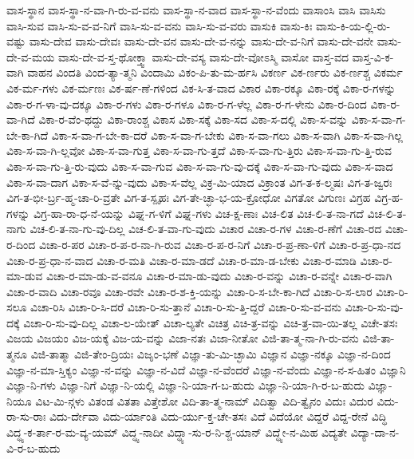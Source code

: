 {ವಾಸ-ಸ್ಥಾನ
ವಾಸ-ಸ್ಥಾ-ನ-ವಾ-ಗಿ-ರು-ವ-ವನು
ವಾಸ-ಸ್ಥಾ-ನ-ವಾದ
ವಾಸ-ಸ್ಥಾ-ನ-ವೆಂದು
ವಾಸಾಂಸಿ
ವಾಸಿ
ವಾಸಿಸು
ವಾಸಿ-ಸುವ
ವಾಸಿ-ಸು-ವ-ವ-ನಿಗೆ
ವಾಸಿ-ಸು-ವ-ವನು
ವಾಸಿ-ಸು-ವ-ವರು
ವಾಸುಕಿ
ವಾಸು-ಕಿಃ
ವಾಸು-ಕಿ-ಯ-ಲ್ಲಿ-ರು-ವಷ್ಟು
ವಾಸು-ದೇವ
ವಾಸು-ದೇವಃ
ವಾಸು-ದೇ-ವನ
ವಾಸು-ದೇ-ವ-ನನ್ನು
ವಾಸು-ದೇ-ವ-ನಿಗೆ
ವಾಸು-ದೇ-ವನೇ
ವಾಸು-ದೇ-ವ-ಮಯ
ವಾಸು-ದೇ-ವ-ಸ್ತ-ಥೋಕ್ತ್ವಾ
ವಾಸು-ದೇ-ವಸ್ಯ
ವಾಸು-ದೇ-ವೋಽಸ್ಮಿ
ವಾಸೋ
ವಾಸ್ತ-ವದ
ವಾಸ್ತ-ವಿ-ಕ-ವಾಗಿ
ವಾಹನ
ವಿಂದತಿ
ವಿಂದ-ತ್ಯಾ-ತ್ಮನಿ
ವಿಂದಾಮಿ
ವಿಕಂ-ಪಿ-ತು-ಮ-ರ್ಹಸಿ
ವಿಕರ್ಣ
ವಿಕ-ರ್ಣರು
ವಿಕ-ರ್ಣಶ್ಚ
ವಿಕರ್ಮ
ವಿಕ-ರ್ಮ-ಗಳು
ವಿಕ-ರ್ಮಣಃ
ವಿಕ-ರ್ಷ-ಣೆ-ಗಳಿಂದ
ವಿಕ-ಸಿ-ತ-ವಾದ
ವಿಕಾರ
ವಿಕಾ-ರಕ್ಕೂ
ವಿಕಾ-ರಕ್ಕೆ
ವಿಕಾ-ರ-ಗಳನ್ನು
ವಿಕಾ-ರ-ಗ-ಳಾ-ವು-ದಕ್ಕೂ
ವಿಕಾ-ರ-ಗಳು
ವಿಕಾ-ರ-ಗಳೂ
ವಿಕಾ-ರ-ಗ-ಳೆಲ್ಲ
ವಿಕಾ-ರ-ಗ-ಳೇನು
ವಿಕಾ-ರ-ದಿಂದ
ವಿಕಾ-ರ-ವಾ-ಗಿದೆ
ವಿಕಾ-ರ-ವೆಂ-ಥದ್ದು
ವಿಕಾ-ರಾಂಶ್ಚ
ವಿಕಾಸ
ವಿಕಾ-ಸಕ್ಕೆ
ವಿಕಾ-ಸದ
ವಿಕಾ-ಸ-ದಲ್ಲಿ
ವಿಕಾ-ಸ-ವನ್ನು
ವಿಕಾ-ಸ-ವಾ-ಗ-ಬೇ-ಕಾ-ಗಿದೆ
ವಿಕಾ-ಸ-ವಾ-ಗ-ಬೇ-ಕಾ-ದರೆ
ವಿಕಾ-ಸ-ವಾ-ಗ-ಬೇಕು
ವಿಕಾ-ಸ-ವಾ-ಗಲು
ವಿಕಾ-ಸ-ವಾಗಿ
ವಿಕಾ-ಸ-ವಾ-ಗಿಲ್ಲ
ವಿಕಾ-ಸ-ವಾ-ಗಿ-ಲ್ಲವೋ
ವಿಕಾ-ಸ-ವಾ-ಗುತ್ತ
ವಿಕಾ-ಸ-ವಾ-ಗು-ತ್ತದೆ
ವಿಕಾ-ಸ-ವಾ-ಗು-ತ್ತಿರು
ವಿಕಾ-ಸ-ವಾ-ಗು-ತ್ತಿ-ರುವ
ವಿಕಾ-ಸ-ವಾ-ಗು-ತ್ತಿ-ರು-ವುದು
ವಿಕಾ-ಸ-ವಾ-ಗುವ
ವಿಕಾ-ಸ-ವಾ-ಗು-ವು-ದಕ್ಕೆ
ವಿಕಾ-ಸ-ವಾ-ಗು-ವುದು
ವಿಕಾ-ಸ-ವಾದ
ವಿಕಾ-ಸ-ವಾ-ದಾಗ
ವಿಕಾ-ಸ-ವೆ-ನ್ನು-ವುದು
ವಿಕಾ-ಸ-ವೆಲ್ಲ
ವಿಕ್ರ-ಮಿ-ಯಾದ
ವಿಕ್ರಾಂತ
ವಿಗ-ತ-ಕ-ಲ್ಮಷಃ
ವಿಗ-ತ-ಜ್ವರಃ
ವಿಗ-ತ-ಭೀ-ರ್ಬ್ರ-ಹ್ಮ-ಚಾ-ರಿ-ವ್ರತೇ
ವಿಗ-ತ-ಸ್ಪೃಹಃ
ವಿಗ-ತೇ-ಚ್ಛಾ-ಭ-ಯ-ಕ್ರೋಧೋ
ವಿಗತೋ
ವಿಗುಣಃ
ವಿಗ್ರಹ
ವಿಗ್ರ-ಹ-ಗಳನ್ನು
ವಿಗ್ರ-ಹಾ-ರಾ-ಧ-ನೆ-ಯನ್ನು
ವಿಘ್ನ-ಗ-ಳಿಗೆ
ವಿಘ್ನ-ಗಳು
ವಿಚ-ಕ್ಷ-ಣಾಃ
ವಿಚ-ಲಿತ
ವಿಚ-ಲಿ-ತ-ನಾ-ಗದೆ
ವಿಚ-ಲಿ-ತ-ನಾಗು
ವಿಚ-ಲಿ-ತ-ನಾ-ಗು-ವು-ದಿಲ್ಲ
ವಿಚ-ಲಿ-ತ-ವಾ-ಗು-ವುದು
ವಿಚಾರ
ವಿಚಾ-ರ-ಗಳ
ವಿಚಾ-ರ-ಣೆಗೆ
ವಿಚಾ-ರದ
ವಿಚಾ-ರ-ದಿಂದ
ವಿಚಾ-ರ-ಪರ
ವಿಚಾ-ರ-ಪ-ರ-ನಾ-ಗಿ-ರುವ
ವಿಚಾ-ರ-ಪ-ರ-ನಿಗೆ
ವಿಚಾ-ರ-ಪ್ರ-ಣಾ-ಳಿಗೆ
ವಿಚಾ-ರ-ಪ್ರ-ಧಾ-ನದ
ವಿಚಾ-ರ-ಪ್ರ-ಧಾ-ನ-ವಾದ
ವಿಚಾ-ರ-ಮತಿ
ವಿಚಾ-ರ-ಮಾ-ಡದೆ
ವಿಚಾ-ರ-ಮಾ-ಡ-ಬೇಕು
ವಿಚಾ-ರ-ಮಾಡಿ
ವಿಚಾ-ರ-ಮಾ-ಡುವ
ವಿಚಾ-ರ-ಮಾ-ಡು-ವ-ವನೂ
ವಿಚಾ-ರ-ಮಾ-ಡು-ವುದು
ವಿಚಾ-ರ-ವನ್ನು
ವಿಚಾ-ರ-ವನ್ನೇ
ವಿಚಾ-ರ-ವಾಗಿ
ವಿಚಾ-ರ-ವಾದಿ
ವಿಚಾ-ರವೂ
ವಿಚಾ-ರವೇ
ವಿಚಾ-ರ-ಶ-ಕ್ತಿ-ಯನ್ನು
ವಿಚಾ-ರಿ-ಸ-ಬೇ-ಕಾ-ಗಿದೆ
ವಿಚಾ-ರಿ-ಸ-ಲಾರ
ವಿಚಾ-ರಿ-ಸಲೂ
ವಿಚಾ-ರಿಸಿ
ವಿಚಾ-ರಿ-ಸಿ-ದರೆ
ವಿಚಾ-ರಿ-ಸು-ತ್ತಾನೆ
ವಿಚಾ-ರಿ-ಸು-ತ್ತಿ-ದ್ದರೆ
ವಿಚಾ-ರಿ-ಸು-ವ-ವನು
ವಿಚಾ-ರಿ-ಸು-ವು-ದಕ್ಕೆ
ವಿಚಾ-ರಿ-ಸು-ವು-ದಿಲ್ಲ
ವಿಚಾ-ಲ-ಯೇತ್
ವಿಚಾ-ಲ್ಯತೇ
ವಿಚಿತ್ರ
ವಿಚಿ-ತ್ರ-ವನ್ನು
ವಿಚಿ-ತ್ರ-ವಾ-ಯಿ-ತಲ್ಲ
ವಿಚೇ-ತಸಃ
ವಿಜಯ
ವಿಜಯಂ
ವಿಜ-ಯಕ್ಕೆ
ವಿಜ-ಯ-ವನ್ನು
ವಿಜಾ-ನತಃ
ವಿಜಾ-ನೀತೋ
ವಿಜಿ-ತಾ-ತ್ಮ-ನಾ-ಗಿ-ರು-ವನು
ವಿಜಿ-ತಾ-ತ್ಮನೂ
ವಿಜಿ-ತಾತ್ಮಾ
ವಿಜಿ-ತೇಂ-ದ್ರಿಯಃ
ವಿಜೃಂ-ಭಣೆ
ವಿಜ್ಞಾ-ತು-ಮಿ-ಚ್ಛಾಮಿ
ವಿಜ್ಞಾನ
ವಿಜ್ಞಾ-ನಕ್ಕೂ
ವಿಜ್ಞಾ-ನ-ದಿಂದ
ವಿಜ್ಞಾ-ನ-ಮಾ-ಸ್ತಿಕ್ಯಂ
ವಿಜ್ಞಾ-ನ-ವನ್ನು
ವಿಜ್ಞಾ-ನ-ವಿದೆ
ವಿಜ್ಞಾ-ನ-ವೆಂದರೆ
ವಿಜ್ಞಾ-ನ-ವೆಂದು
ವಿಜ್ಞಾ-ನ-ಸ-ಹಿತಂ
ವಿಜ್ಞಾನಿ
ವಿಜ್ಞಾ-ನಿ-ಗಳು
ವಿಜ್ಞಾ-ನಿಗೆ
ವಿಜ್ಞಾ-ನಿ-ಯಲ್ಲಿ
ವಿಜ್ಞಾ-ನಿ-ಯಾ-ಗ-ಬ-ಹುದು
ವಿಜ್ಞಾ-ನಿ-ಯಾ-ಗಿ-ರ-ಬ-ಹುದು
ವಿಜ್ಞಾ-ನಿಯೂ
ವಿಟ-ಮಿ-ನ್ಗಳು
ವಿತಂಡ
ವಿತತಾ
ವಿತ್ತೇಶೋ
ವಿದಿ-ತಾ-ತ್ಮ-ನಾಮ್
ವಿದಿತ್ವಾ
ವಿದಿ-ತ್ವೈನಂ
ವಿದುಃ
ವಿದುರ
ವಿದು-ರಾ-ಸು-ರಾಃ
ವಿದು-ರ್ದೇವಾ
ವಿದು-ರ್ಯಾಂತಿ
ವಿದು-ರ್ಯು-ಕ್ತ-ಚೇ-ತಸಃ
ವಿದೆ
ವಿದೆಯೋ
ವಿದ್ದರೆ
ವಿದ್ದ-ರೇನೆ
ವಿದ್ಧಿ
ವಿದ್ಧ್ಯ-ಕ-ರ್ತಾ-ರ-ಮ-ವ್ಯ-ಯಮ್
ವಿದ್ಧ್ಯ-ನಾದೀ
ವಿದ್ಧ್ಯಾ-ಸು-ರ-ನಿ-ಶ್ಚ-ಯಾನ್
ವಿದ್ಧ್ಯೇ-ನ-ಮಿಹ
ವಿದ್ಯತೇ
ವಿದ್ಯಾ-ದಾ-ನ-ವಿ-ರ-ಬ-ಹುದು
}
